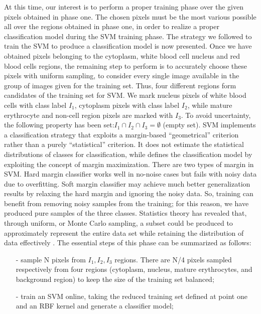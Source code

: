 \documentclass[final,a4paper,12pt,english]{UnicaPhdThesis3}
\begin{document}
{%
At this time, our interest is to perform a proper training phase over the given pixels obtained in phase one. The chosen pixels must be the most various possible all over the regions obtained in phase one, in order to realize a proper classification model during the SVM training phase. 
The strategy we followed to train the SVM to produce a classification model is now presented. Once we have obtained pixels belonging to the cytoplasm, white blood cell nucleus and red blood cells regions, the remaining step to perform is to accurately choose these pixels with uniform sampling, to consider every single image available in the group of images given for the training set.
Thus, four different regions form candidates of the training set for SVM. We mark nucleus pixels of white blood cells with class label $I_1$, cytoplasm pixels with class label $I_2$, while mature erythrocyte and non-cell region pixels are marked with $I_3$. To avoid uncertainty, the following property has been set:$ I_1\cap I_2 \cap I_3 = \emptyset$ (empty set). SVM implements a classification strategy that exploits a margin-based “geometrical” criterion rather than a purely “statistical” criterion. It does not estimate the statistical distributions of classes for classification, while defines the classification model by exploiting the concept of margin maximization. There are two types of margin in SVM. Hard margin classifier works well in no-noise cases but fails with noisy data due to overfitting. Soft margin classifier may achieve much better generalization results by relaxing the hard margin and ignoring the noisy data. So, training can benefit from removing noisy samples from the training; for this reason, we have produced pure samples of the three classes. Statistics theory has revealed that, through uniform, or Monte Carlo sampling, a subset could be produced to approximately represent the entire data set while retaining the distribution of data effectively \cite{caflisch}.
The essential steps of this phase can be summarized as follows:
\begin{itemize}\itemsep3pt \parskip0pt 
	\item[-] sample N pixels from $ I_1, I_2, I_3$ regions. There are N/4 pixels sampled respectively from four regions (cytoplasm, nucleus, mature erythrocytes, and background region) to keep the size of the training set balanced;
	\item[-] train an SVM online, taking the reduced training set defined at point one and an RBF kernel and generate a classifier model;

\end{itemize}}
\end{document}
